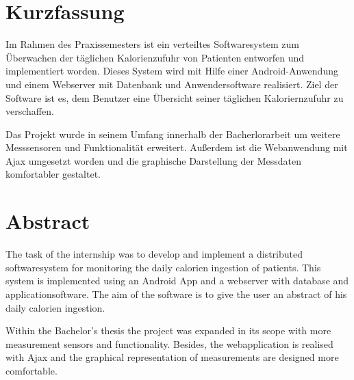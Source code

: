 

\section*{Kurzfassung}

Im Rahmen des Praxissemesters ist ein verteiltes Softwaresystem zum \"Uberwachen der t\"aglichen Kalorienzufuhr von Patienten
entworfen und implementiert worden.
Dieses System wird mit Hilfe einer Android-Anwendung und einem Webserver mit Datenbank und Anwendersoftware realisiert.
Ziel der Software ist es, dem Benutzer eine \"Ubersicht seiner t\"aglichen Kaloriernzufuhr zu verschaffen.

Das Projekt wurde in seinem Umfang innerhalb der Bacherlorarbeit um weitere Messsensoren und Funktionalit\"at erweitert.
Au\ss{}erdem ist die Webanwendung mit Ajax umgesetzt worden und die graphische Darstellung der Messdaten komfortabler gestaltet.




\section*{Abstract}

The task of the internship was to develop and implement a distributed softwaresystem for monitoring the daily calorien ingestion of patients.
This system is implemented using an Android App and a webserver with database and applicationsoftware.
The aim of the software is to give the user an abstract of his daily calorien ingestion.

Within the Bachelor's thesis the project was expanded in its scope with more measurement sensors and functionality.
Besides, the webapplication is realised with Ajax and the graphical representation of measurements are designed more comfortable.
